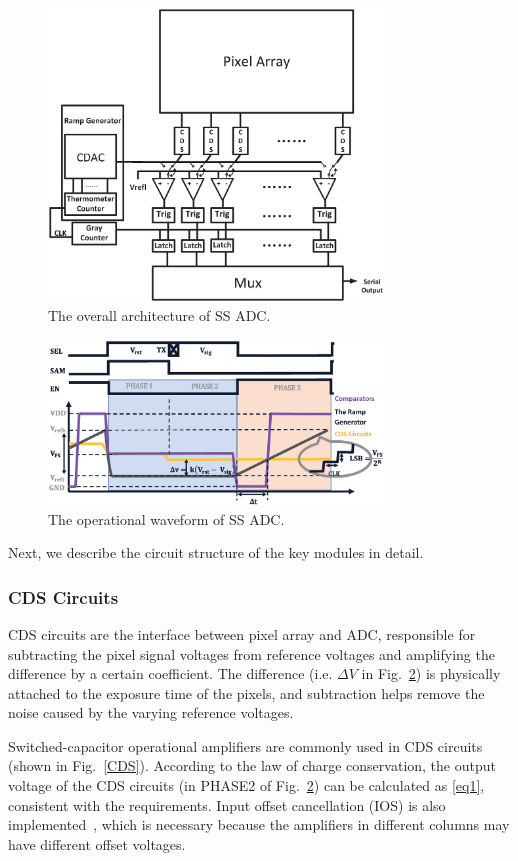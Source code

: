 \begin{figure}[htbp]
	\centerline{\includegraphics[width=3.5in]{./Figures/SSADC.eps}}
	\caption{The overall architecture of SS ADC.}
	\label{SSADC}
\end{figure} 

\begin{figure}[htbp]
	\centerline{\includegraphics[width=3.5in]{./Figures/SSWAVE.eps}}
	\caption{The operational waveform of SS ADC.}
	\label{SSWAVE}
\end{figure}

Next, we describe the circuit structure of the key modules in detail. 

\subsubsection{CDS Circuits}

CDS circuits are the interface between pixel array and ADC, responsible for subtracting the pixel signal voltages 
from reference voltages and amplifying the difference by a certain coefficient. The difference (i.e. $\Delta{V}$ 
in Fig.~\ref{SSWAVE}) is physically attached to the exposure time of the pixels, and subtraction helps remove the 
noise caused by the varying reference voltages. 

Switched-capacitor operational amplifiers are commonly used in CDS circuits (shown in Fig.~\ref{CDS}). According to the law of charge conservation, 
the output voltage of the CDS circuits (in PHASE2 of Fig.~\ref{SSWAVE}) can be calculated as \eqref{eq1}, consistent with the requirements. Input offset cancellation (IOS) is also implemented~\cite{razavi_design_1992}, 
which is necessary because the amplifiers in different columns may have different offset voltages.

